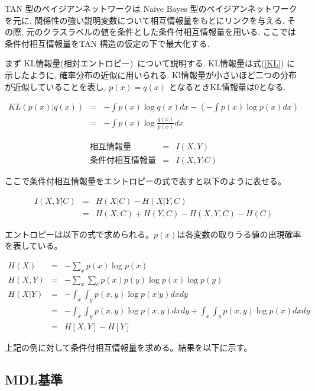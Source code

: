 \documentclass[a4j,12pt]{jarticle}
\begin{document}
TAN 型のベイジアンネットワークは Naive Bayes 型のベイジアンネットワークを元に, 関係性の強い説明変数について相互情報量をもとにリンクを与える. その際, 元のクラスラベルの値を条件とした条件付相互情報量を用いる. ここでは条件付相互情報量をTAN 構造の仮定の下で最大化する.

まず KL情報量(相対エントロピー)~\cite{Meyer}について説明する. KL情報量は式(\ref{KL}) に示したように, 確率分布の近似に用いられる. Kl情報量が小さいほど二つの分布が近似していることを表し, $p(x) = q(x)$ となるときKL情報量は$0$となる.

\begin{eqnarray}
\label{KL}
KL(p(x) | q(x)) &=& - \int p(x) \log q(x) dx - \left(- \int p(x) \log p(x) dx \right) \nonumber \\ 
                    &=& - \int p(x) \log \frac{q(x)}{p(x)} dx
\end{eqnarray}



\begin{eqnarray}
\mbox{相互情報量} &=& I(X, Y) \\
\mbox{条件付相互情報量} &=& I(X, Y | C)
\end{eqnarray}

ここで条件付相互情報量をエントロピーの式で表すと以下のように表せる。

\begin{eqnarray*}
I(X, Y | C) &=& H(X|C) - H(X|Y, C) \\
               &=& H(X, C) + H(Y, C) - H(X, Y, C) - H(C)
\end{eqnarray*}

エントロピーは以下の式で求められる。$p(x)$は各変数の取りうる値の出現確率を表している。

\begin{eqnarray*}
H(X) &=& - \sum_x p(x) \log p(x) \\
H(X, Y) &=& - \sum_x \sum_c p(x) p(y) \log p(x) \log p(y)　\\
H(X| Y) &=& - \int_x \int_y p(x, y) \log p(x| y) dx dy \\
           &=& - \int_x \int_y p(x, y) \log p(x, y) dx dy + \int_x \int_y p(x, y) \log p(x) dx dy \\
           &=& H[X, Y] - H[Y] 
\end{eqnarray*}

上記の例に対して条件付相互情報量を求める。結果を以下に示す。

\subsection{MDL基準}
\end{document}
